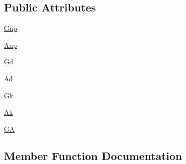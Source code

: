 \subsection*{Public Attributes}
\begin{DoxyCompactItemize}
\item 
\hyperlink{classnetworkx_1_1algorithms_1_1approximation_1_1tests_1_1test__kcomponents_1_1TestAntiGraph_a9f5d274e1cd33b9be67b328c96283c8b}{Gnp}
\item 
\hyperlink{classnetworkx_1_1algorithms_1_1approximation_1_1tests_1_1test__kcomponents_1_1TestAntiGraph_ac3b536c54aeb54e96512bd06880a3fe6}{Anp}
\item 
\hyperlink{classnetworkx_1_1algorithms_1_1approximation_1_1tests_1_1test__kcomponents_1_1TestAntiGraph_a7d091b4ad51c3e1f0d858dbcf2c59ce0}{Gd}
\item 
\hyperlink{classnetworkx_1_1algorithms_1_1approximation_1_1tests_1_1test__kcomponents_1_1TestAntiGraph_a243493f83ab14e78b116e7cc06eb76b4}{Ad}
\item 
\hyperlink{classnetworkx_1_1algorithms_1_1approximation_1_1tests_1_1test__kcomponents_1_1TestAntiGraph_afdb091a5ac01dfe2af79c3007c01f369}{Gk}
\item 
\hyperlink{classnetworkx_1_1algorithms_1_1approximation_1_1tests_1_1test__kcomponents_1_1TestAntiGraph_afc0f829e718d181c0370fd685609598d}{Ak}
\item 
\hyperlink{classnetworkx_1_1algorithms_1_1approximation_1_1tests_1_1test__kcomponents_1_1TestAntiGraph_ae611fba706e029ae1648a0908806a8df}{GA}
\end{DoxyCompactItemize}


\subsection{Member Function Documentation}
\mbox{\label{classnetworkx_1_1algorithms_1_1approximation_1_1tests_1_1test__kcomponents_1_1TestAntiGraph_ac60e021e2676e1f2edbb7c77278ed179}} 
